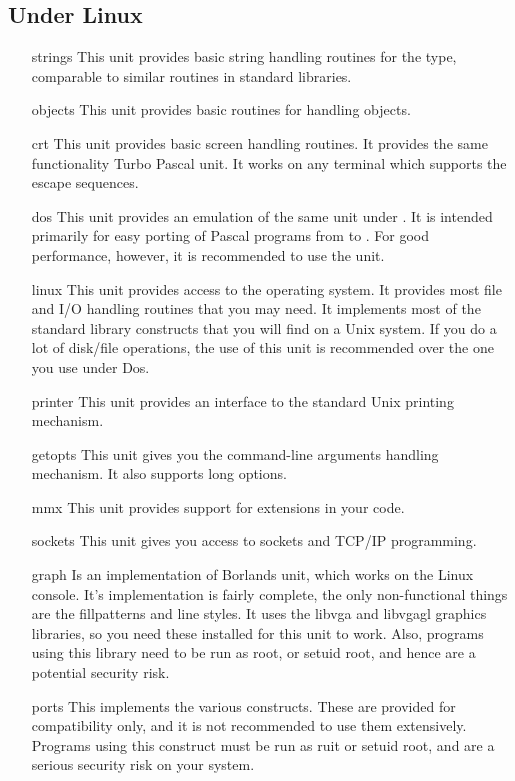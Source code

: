 \documentclass{report}
\begin{document}
\subsection{Under Linux}
\begin{itemize}
\item [strings] This unit provides basic
string handling routines for the  type, comparable to similar
routines in standard  libraries.
\item [objects] This unit provides basic
routines for handling objects.
\item [crt] This unit provides basic screen
handling routines. It provides the same functionality Turbo Pascal 
unit. It works on any terminal which supports the  escape
sequences.
\item [dos] This unit provides an emulation of the
same unit under \dos. It is intended primarily for easy porting of Pascal
programs from \dos to \linux. For good performance, however, it is
recommended to use the  unit.
\item [linux] This unit provides access to the
\linux operating system. It provides most file and I/O handling routines
that you may need. It implements most of the standard  library constructs
that you will find on a Unix system. If you do a lot of disk/file
operations, the use of this unit is recommended over the one you use under
Dos.
\item [printer] This unit provides an
interface to the standard Unix printing mechanism.
\item [getopts] This unit gives you the
\gnu {} command-line arguments  handling mechanism. 
It also supports long options.
\item [mmx] This unit provides support for  extensions in your
code.
\item [sockets] This unit gives you access to sockets and TCP/IP
programming.
\item [graph] Is an implementation of Borlands  unit, which
works on the Linux console. It's implementation is fairly complete, the only
non-functional things are the fillpatterns and line styles. It uses the
libvga and libvgagl graphics libraries, so you need these installed for this
unit to work. Also, programs using this library need to be run as root, or
setuid  root, and hence are a potential security risk.
\item [ports] This implements the various  constructs. These are 
provided for compatibility only, and it is not recommended to use them
extensively. Programs using this construct must be run as ruit or setuid
root, and are a serious security risk on your system.
\end{itemize}
\end{document}
